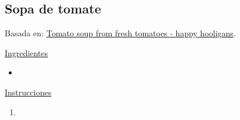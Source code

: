 \subsection{Sopa de tomate}

Basada en: \href{https://happyhooligans.ca/best-homemade-tomato-soup-recipe/}{Tomato soup from fresh tomatoes - happy hooligans}. 

\underline{Ingredientes}

\begin{itemize}
\item 
\end{itemize}

\underline{Instrucciones}

\begin{enumerate}
\item 
\end{enumerate}
